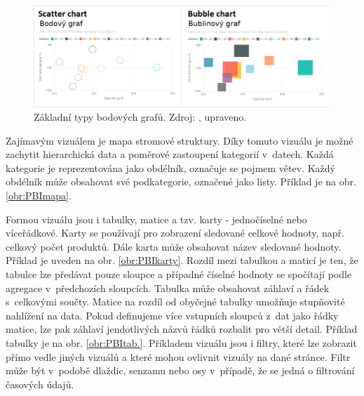 \begin{figure}[h!]
    \centering
    \captionsetup{justification=centering}
    \includegraphics[width=.9\textwidth]{obrazky/PBIteorie/power-bi-compare-charts.png}
    \caption{Základní typy bodových grafů. 
    Zdroj: \cite{bib:PBI}, upraveno.}
    \label{obr:PBI:grafybod}
\end{figure}

Zajímavým vizuálem je mapa stromové struktury. Díky tomuto vizuálu je možné zachytit hierarchická data a poměrové zastoupení kategorií v~datech. Každá kategorie je reprezentována jako obdélník, označuje se pojmem větev. Každý obdélník může obsahovat své podkategorie, označené jako listy. Příklad je na obr. \ref*{obr:PBImapa}.

Formou vizuálu jsou i tabulky, matice a tzv. karty - jednočíselné nebo víceřádkové. Karty se používají pro zobrazení sledované celkové hodnoty, např. celkový počet produktů. Dále karta může obsahovat název sledované hodnoty. Příklad je uveden na obr. \ref*{obr:PBIkarty}. 
Rozdíl mezi tabulkou a maticí je ten, že tabulce lze předávat pouze sloupce a případné číselné hodnoty se spočítají podle agregace v~předchozích sloupcích. Tabulka může obsahovat záhlaví a řádek s~celkovými součty. Matice na rozdíl od obyčejné tabulky umožňuje stupňovité nahlížení na data. Pokud definujeme více vstupních sloupců z~dat jako řádky matice, lze pak záhlaví jendotlivých názvů řádků rozbalit pro větší detail. Příklad tabulky je na obr.         \ref*{obr:PBItab.}. 
Příkladem vizuálu jsou i filtry, které lze zobrazit přímo vedle jiných vizuálů a které mohou ovlivnit vizuály na dané stránce. Filtr může být v~podobě dlaždic, senzamu nebo osy v~případě, že se jedná o filtrování časových údajů.

